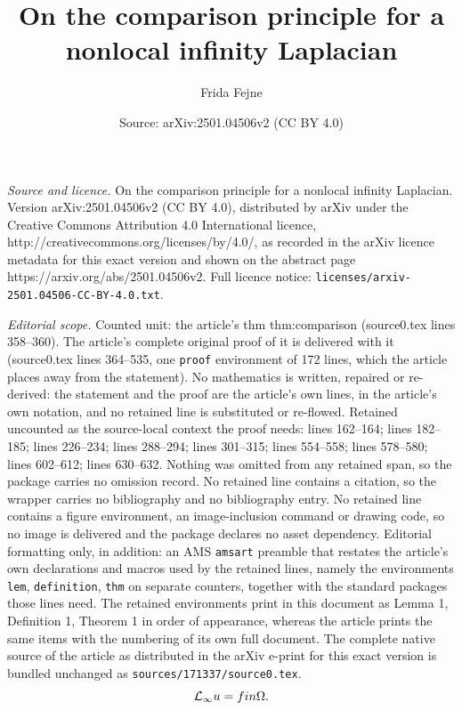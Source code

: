 \documentclass[10pt,a4paper]{amsart}
\title{On the comparison principle for a nonlocal infinity Laplacian}
\author{Frida Fejne}
\date{Source: arXiv:2501.04506v2 (CC BY 4.0)}
\providecommand{\Linf}{\mathcal{L}_{\infty}}
\begin{document}
\maketitle

\noindent\emph{Source and licence.} On the comparison principle for a nonlocal infinity Laplacian. Version arXiv:2501.04506v2 (CC BY 4.0), distributed by arXiv under the Creative Commons Attribution 4.0 International licence, http://creativecommons.org/licenses/by/4.0/, as recorded in the arXiv licence metadata for this exact version and shown on the abstract page https://arxiv.org/abs/2501.04506v2. Full licence notice: \texttt{licenses/arxiv-2501.04506-CC-BY-4.0.txt}.\par\smallskip

\noindent\textit{Editorial scope.} Counted unit: the article's thm thm:comparison (source0.tex lines 358--360). The article's complete original proof of it is delivered with it (source0.tex lines 364--535, one \texttt{proof} environment of 172 lines, which the article places away from the statement). No mathematics is written, repaired or re-derived: the statement and the proof are the article's own lines, in the article's own notation, and no retained line is substituted or re-flowed.  Retained uncounted as the source-local context the proof needs: lines 162--164; lines 182--185; lines 226--234; lines 288--294; lines 301--315; lines 554--558; lines 578--580; lines 602--612; lines 630--632.  Nothing was omitted from any retained span, so the package carries no omission record.  No retained line contains a citation, so the wrapper carries no bibliography and no bibliography entry.  No retained line contains a figure environment, an image-inclusion command or drawing code, so no image is delivered and the package declares no asset dependency.  Editorial formatting only, in addition: an AMS \texttt{amsart} preamble that restates the article's own declarations and macros used by the retained lines, namely the environments \texttt{lem}, \texttt{definition}, \texttt{thm} on separate counters, together with the standard packages those lines need.  The retained environments print in this document as Lemma 1, Definition 1, Theorem 1 in order of appearance, whereas the article prints the same items with the numbering of its own full document.  The complete native source of the article as distributed in the arXiv e-print for this exact version is bundled unchanged as \texttt{sources/171337/source0.tex}.
\begin{equation}\label{eq:Luf2}   
\Linf u=f  \textup{ in }  \Omega.
\end{equation}
\end{document}
